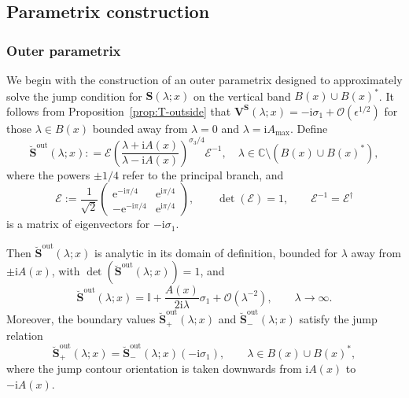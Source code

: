 \documentclass[12pt]{amsart}
\numberwithin{equation}{section}
\newcommand{\ee}{\mathrm{e}}
\newcommand{\ii}{\mathrm{i}}
\newcommand{\SP}{\lambda}
\newcommand{\C}{\mathbb{C}}
\newcommand{\eps}{\epsilon}
\newcommand{\bigo}[1]{ \mathcal{O}\! \left( #1 \right) }
\begin{document}
\subsection{Parametrix construction}
\label{sec-parametrix}
\subsubsection{Outer parametrix}

We begin with the construction of an outer parametrix designed to approximately solve the jump condition for $\mathbf{S}(\SP ; x)$ on the vertical band $B(x) \cup B(x)^*$. 
It follows from Proposition~\ref{prop:T-outside} that $\mathbf{V^S}(\lambda;x) =  -\ii \sigma_1 + \bigo{\eps^{1/2}}$ for those $\SP \in B(x)$ bounded away from $\SP =0$ and $\SP = \ii A_\text{max}$. Define
\begin{equation}
\label{eq:S.out.matrix}
	\breve{\mathbf{S}}^{\mathrm{out}}(\SP;x) : = \boldsymbol{\mathcal{E}} \left( \frac{\SP + \ii A(x)}{\SP- \ii A(x)} \right)^{\sigma_3/4} \boldsymbol{\mathcal{E}}^{-1}, \quad \SP \in \C \setminus ( B(x) \cup B(x)^* ),
\end{equation}
where the powers $\pm1/4$ refer to the principal branch, and 
\begin{equation}
	\boldsymbol{\mathcal{E}}:= \frac{1}{\sqrt{2}} \begin{pmatrix} \ee^{-\ii \pi/4} & \ee^{\ii \pi/4} \\ -\ee^{-\ii \pi/4} & \ee^{\ii \pi/4}\end{pmatrix}, 
	\qquad \det(\boldsymbol{\mathcal{E}}) = 1, \qquad \boldsymbol{\mathcal{E}}^{-1} = \boldsymbol{\mathcal{E}}^\dagger
	\label{eq:E-matrix-def}
\end{equation}
is a matrix of eigenvectors for $-\ii \sigma_1$. 

Then $\breve{\mathbf{S}}^{\mathrm{out}}(\SP;x)$ is analytic in its domain of definition, bounded for $\SP$ away from $\pm \ii A(x)$, with $\det (\breve{\mathbf{S}}^{\mathrm{out}}(\SP;x)) = 1$, and 
\begin{equation}\label{eq:S.out.expand}
	\breve{\mathbf{S}}^{\mathrm{out}}(\SP;x) = \mathbb{I} + \frac{ A(x)}{2\ii \SP} \sigma_1+\bigo{\SP^{-2}}, \qquad \SP \to \infty.
\end{equation}
Moreover, the boundary values $\breve{\mathbf{S}}^{\mathrm{out}}_+(\SP;x)$ and $\breve{\mathbf{S}}^{\mathrm{out}}_-(\SP;x)$ satisfy the jump relation 
\begin{equation}
	\breve{\mathbf{S}}^{\mathrm{out}}_+(\SP;x) = \breve{\mathbf{S}}^{\mathrm{out}}_-(\SP;x) (-\ii \sigma_1),  \qquad \lambda \in B(x) \cup B(x)^*,
\end{equation}
where the jump contour orientation is taken downwards from $\ii A(x)$ to $-\ii A(x)$. 
\end{document}
